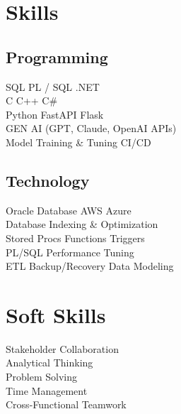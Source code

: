 \documentclass[a4paper,hidelinks]{deedy-resume} %
\begin{document}
\begin{minipage}[t]{0.33\textwidth}



\section{Skills}

\subsection{Programming}
SQL \textbullet{} PL / SQL \textbullet{}.NET \\
C \textbullet{} {C++} \textbullet{} C\# \\
Python \textbullet{} FastAPI \textbullet{} Flask \\
GEN AI (GPT, Claude, OpenAI APIs) \\
Model Training \& Tuning \textbullet{} CI/CD \\



\subsection{Technology}
Oracle Database  \textbullet{} AWS \textbullet{} Azure \\
Database Indexing \& Optimization \\
Stored Procs \textbullet{} Functions \textbullet{} Triggers \\
PL/SQL Performance Tuning \\





ETL \textbullet{} Backup/Recovery \textbullet{} Data Modeling \\

\sectionspace %


\section{Soft Skills}
Stakeholder Collaboration \\
Analytical Thinking \\
Problem Solving \\
Time Management \\
Cross-Functional Teamwork


\end{minipage}
\end{document}
